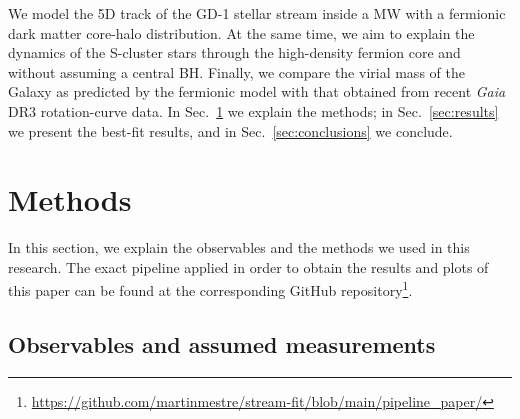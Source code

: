 \documentclass[twocolumn]{aa}
\begin{document}
We model the 5D track of the GD-1 stellar stream inside a MW with a fermionic dark matter core-halo distribution. At the same time, we aim to explain the dynamics of the S-cluster stars through the high-density fermion core and without assuming a central BH. Finally, we compare the virial mass of the Galaxy as predicted by the fermionic model with that obtained from recent {\it Gaia} DR3 rotation-curve data. In Sec.~\ref{sec:methodology} we explain the methods; in Sec.~\ref{sec:results} we present the best-fit results, and in Sec.~\ref{sec:conclusions} we conclude.

\section{Methods}
\label{sec:methodology}
In this section, we explain the observables and the methods we used in this research.
The exact pipeline applied in order to obtain the results and plots of this paper
can be found at the corresponding GitHub repository\footnote{
\url{https://github.com/martinmestre/stream-fit/blob/main/pipeline_paper/}}.

\subsection{Observables and assumed measurements}
\label{sec:observables}
\end{document}

